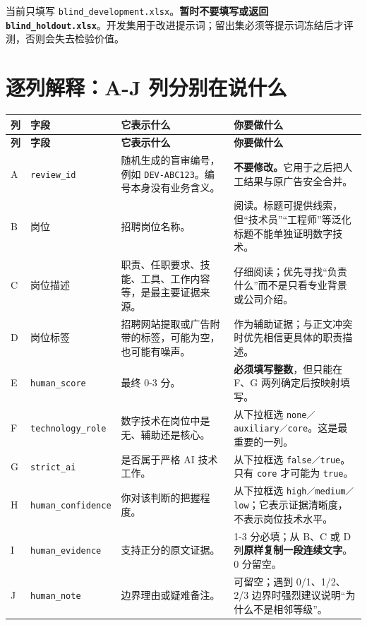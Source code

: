 \documentclass[11pt,a4paper,fontset=none]{ctexart}
\newcommand{\field}[1]{\nolinkurl{#1}}
\begin{document}
当前只填写 \texttt{blind\_development.xlsx}。\textbf{暂时不要填写或返回 \texttt{blind\_holdout.xlsx}}。开发集用于改进提示词；留出集必须等提示词冻结后才评测，否则会失去检验价值。

\section{逐列解释：A-J 列分别在说什么}

\begin{longtable}{C{0.8cm} L{3.0cm} L{4.0cm} L{6.2cm}}
\toprule
{}\color{white}\textbf{列} & \color{white}\textbf{字段} & \color{white}\textbf{它表示什么} & \color{white}\textbf{你要做什么}\\
\midrule
\endfirsthead
\toprule
{}\color{white}\textbf{列} & \color{white}\textbf{字段} & \color{white}\textbf{它表示什么} & \color{white}\textbf{你要做什么}\\
\midrule
\endhead
A & \field{review_id} & 随机生成的盲审编号，例如 \texttt{DEV-ABC123}。编号本身没有业务含义。 & \textbf{不要修改。}它用于之后把人工结果与原广告安全合并。\\
B & 岗位 & 招聘岗位名称。 & 阅读。标题可提供线索，但“技术员”“工程师”等泛化标题不能单独证明数字技术。\\
C & 岗位描述 & 职责、任职要求、技能、工具、工作内容等，是最主要证据来源。 & 仔细阅读；优先寻找“负责什么”而不是只看专业背景或公司介绍。\\
D & 岗位标签 & 招聘网站提取或广告附带的标签，可能为空，也可能有噪声。 & 作为辅助证据；与正文冲突时优先相信更具体的职责描述。\\
E & \field{human_score} & 最终 0-3 分。 & \textbf{必须填写整数}，但只能在 F、G 两列确定后按映射填写。\\
F & \field{technology_role} & 数字技术在岗位中是无、辅助还是核心。 & 从下拉框选 \texttt{none／auxiliary／core}。这是最重要的一列。\\
G & \field{strict_ai} & 是否属于严格 AI 技术工作。 & 从下拉框选 \texttt{false／true}。只有 \texttt{core} 才可能为 \texttt{true}。\\
H & \field{human_confidence} & 你对该判断的把握程度。 & 从下拉框选 \texttt{high／medium／low}；它表示证据清晰度，不表示岗位技术水平。\\
I & \field{human_evidence} & 支持正分的原文证据。 & 1-3 分必填；从 B、C 或 D 列\textbf{原样复制一段连续文字}。0 分留空。\\
J & \field{human_note} & 边界理由或疑难备注。 & 可留空；遇到 0/1、1/2、2/3 边界时强烈建议说明“为什么不是相邻等级”。\\
\bottomrule
\end{longtable}
\end{document}
